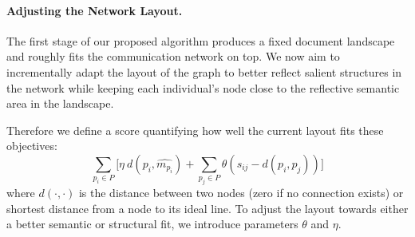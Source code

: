 \paragraph{Adjusting the Network Layout.}
The first stage of our proposed algorithm produces a fixed document landscape and roughly fits the communication network on top. 
We now aim to incrementally adapt the layout of the graph to better reflect salient structures in the network while keeping each individual's node close to the reflective semantic area in the landscape.

Therefore we define a score quantifying how well the current layout fits these objectives:
\begin{equation}
\sum_{p_i\in P}
\bigg[
\eta~d(p_i, \widehat{m_{p_i}})+
\sum_{p_j\in P}
\theta\left(s_{ij}-d(p_i,p_j)\right)
\bigg]
\label{eq:score}
\end{equation}
where $d(\cdot,\cdot)$ is the distance between two nodes (zero if no connection exists) or shortest distance from a node to its ideal line.
To adjust the layout towards either a better semantic or structural fit, we introduce parameters $\theta$ and $\eta$.




